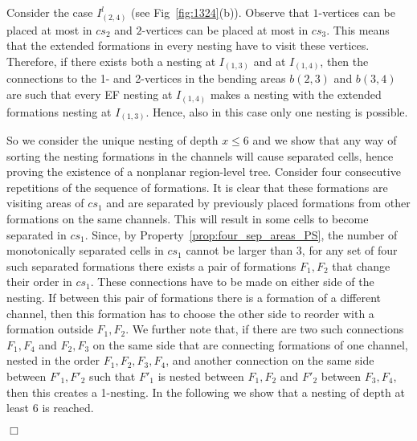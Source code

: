 \documentclass[a4paper,10pt]{llncs}
\newcounter{prop}
\renewenvironment{proof}
{{\bf Proof:}}{\hspace*{\fill}$\Box$\par\vspace{2mm}}
\begin{document}
\begin{proof}
Consider the case $I_{(2,4)}^l$ (see Fig~\ref{fig:1324}(b)). Observe that $1$-vertices can be placed at most in $cs_2$ and $2$-vertices can be placed at most in $cs_3$. This means that the extended formations in every nesting have to visit these vertices. Therefore, if there exists both a nesting at $I_{(1,3)}$ and at $I_{(1,4)}$, then the connections to the 1- and 2-vertices in the bending areas $b(2,3)$ and $b(3,4)$ are such that every EF nesting at $I_{(1,4)}$ makes a nesting with the extended formations nesting at $I_{(1,3)}$. Hence, also in this case only one nesting is possible.

So we consider the unique nesting of depth $x\leq 6$ and we show that any way of sorting the nesting formations in the channels will cause separated cells, hence proving the existence of a nonplanar region-level tree.
Consider four consecutive repetitions of the sequence of formations. It is clear that these formations are visiting areas of $cs_1$ and are separated by previously placed formations from other formations on the same channels. This will result in some cells to become separated in $cs_1$. Since, by Property~\ref{prop:four_sep_areas_PS}, the number of monotonically separated cells in $cs_1$ cannot be larger than $3$, for any set of four such separated formations there exists a pair of formations $F_1,F_2$ that change their order in $cs_1$. These connections have to be made on either side of the nesting. If between this pair of formations there is a formation of a different channel, then this formation has to choose the other side to reorder with a formation outside $F_1,F_2$. We further note that, if there are two such connections $F_1,F_4$ and $F_2,F_3$ on the same side that are connecting formations of one channel, nested in the order $F_1,F_2,F_3,F_4$, and another connection on the same side between $F'_1,F'_2$ such that $F'_1$ is nested between $F_1, F_2$ and $F'_2$ between $F_3,F_4$, then this creates a 1-nesting. In the following we show that a nesting of depth at least 6 is reached.


\end{proof}
\end{document}
